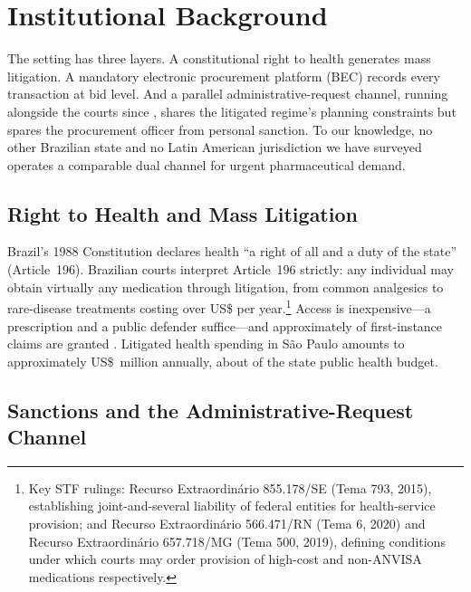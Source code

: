 \section{Institutional Background}
\label{sec:institutional}

The setting has three layers. A constitutional right to health
generates mass litigation. A mandatory electronic procurement
platform (BEC) records every transaction at bid level. And a
parallel administrative-request channel, running alongside the
courts since \BPsampleStartYear, shares the litigated regime's
planning constraints but spares the procurement officer from
personal sanction. To our knowledge, no other Brazilian state and no
Latin American jurisdiction we have surveyed operates a comparable
dual channel for urgent pharmaceutical demand.

\subsection{Right to Health and Mass Litigation}
\label{sec:health_right}

Brazil's 1988 Constitution declares health ``a right of all and a
duty of the state'' (Article~196). Brazilian courts interpret
Article~196 strictly: any individual may obtain virtually any
medication through litigation, from common analgesics to rare-disease
treatments costing over US\$\BPrareDrugCostUSD{} per
year.\footnote{Key STF rulings: Recurso Extraordin\'ario 855.178/SE
(Tema 793, 2015), establishing joint-and-several liability of
federal entities for health-service provision; and Recurso
Extraordin\'ario 566.471/RN (Tema 6, 2020) and Recurso
Extraordin\'ario 657.718/MG (Tema 500, 2019), defining conditions
under which courts may order provision of high-cost and non-ANVISA
medications respectively.} Access is inexpensive---a prescription
and a public defender suffice---and approximately
\BPlitGrantedShare{} of first-instance claims are granted
\citep{cnj2019judicializacao}. Litigated health spending in S\~ao
Paulo amounts to approximately US\$\BPlitSpendingUSDmm~million
annually, about \BPlitSpendingShare{} of the state public health
budget.

\subsection{Sanctions and the Administrative-Request Channel}
\label{sec:sanction_channel}

